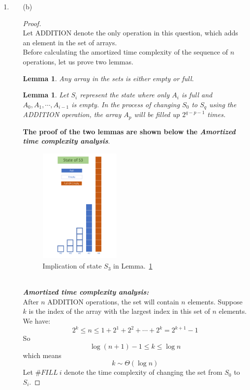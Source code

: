 \documentclass[12pt,a4paper]{article}
\makeatletter
\newtheorem{lemma}[theorem]{Lemma}
\newtheorem*{solution}{Solution}
\theoremstyle{definition}
\renewenvironment{solution}[1][Solution] {\par\pushQED{\qed}\normalfont\topsep6\p@\@plus6\p@\relax\trivlist\item[\hskip\labelsep\bfseries#1\@addpunct{.}]\ignorespaces}{\popQED\endtrivlist\@endpefalse} \makeatother
\makeatother
\begin{document}
\begin{enumerate}
\begin{enumerate}
\begin{solution}
\begin{enumerate}
        \item [(b)] 
        \begin{proof}
        ~\\
        Let \textsc{ADDITION} denote the only operation in this question, which adds an element in the set of arrays. 
        \\
        Before calculating the amortized time complexity of the sequence of $n$ operations, let us prove two lemmas.
        \begin{lemma}\label{lemma1}
        Any array in the sets is either empty or full.
        \end{lemma}
        \begin{lemma} \label{lemma2}
        Let $S_i$ represent the state where only $A_i$ is full and $A_0,A_1,\cdots,A_{i-1}$ is empty. In the process of changing $S_0$ to $S_q$ using the \textsc{ADDITION} operation, the array $A_p$ will be filled
        up $2^{q-p-1}$ times.
        \end{lemma}
    
        \textbf{The proof of the two lemmas are shown below the \textit{Amortized time complexity analysis}}.
        \\
    	\begin{figure}[htbp]
        	\centering
        	\includegraphics[width=0.4\textwidth]{State.pdf}
        	\caption{Implication of state $S_3$ in Lemma.~\ref{lemma2}}
        	\label{State}
    	\end{figure}   
        ~\\
        \textbf{\textit{Amortized time complexity analysis:}}
        \\
        After $n$ \textsc{ADDITION} operations, the set will contain $n$ elements. Suppose $k$ is the index of the array with the largest index in this set of $n$ elements. We have:
        $$2^k\leq n\leq 1+2^1+2^2+\cdots+2^k=2^{k+1}-1$$
        So
        $$\log (n+1)-1 \leq k\leq \log n$$
        which means
        $$k \sim \Theta(\log n)$$
        Let $\# FILL\ i$ denote the time complexity of changing the set from $S_0$ to $S_i$. 
        

\end{proof}
\end{enumerate}
\end{solution}
\end{enumerate}
\end{enumerate}
\end{document}
